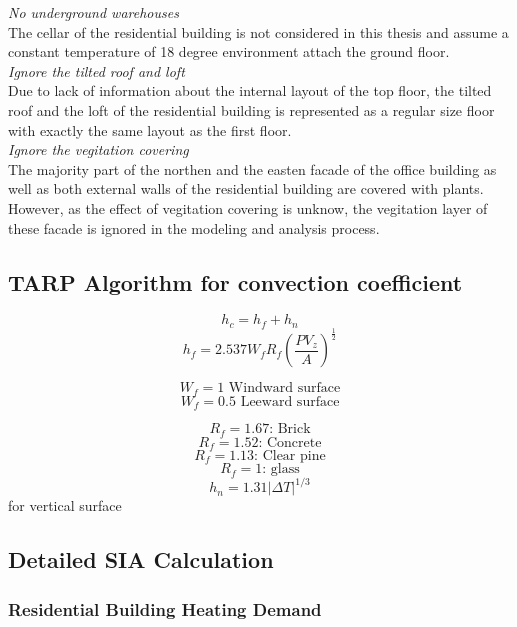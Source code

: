 \documentclass[11pt, a4paper]{article}
\theoremstyle{definition}
\begin{document}
	\textit{No underground warehouses}\\
	The cellar of the residential building is not considered in this thesis and assume a constant temperature of 18 degree environment attach the ground floor.\\

	\textit{Ignore the tilted roof and loft}\\
	Due to lack of information about the internal layout of the top floor, the tilted roof and the loft of the residential building is represented as a regular size floor with exactly the same layout as the first floor.\\

	\textit{Ignore the vegitation covering}\\
	The majority part of the northen and the easten facade of the office building as well as both external walls of the residential building are covered with plants. However, as the effect of vegitation covering is unknow, the vegitation layer of these facade is ignored in the modeling and analysis process.\\


\subsection{TARP Algorithm for convection coefficient}
\[h_c = h_f + h_n\]
\[h_f = 2.537 W_f R_f \left(\frac{PV_z}{A}\right)^\frac{1}{2}\]


\[W_f = 1  \text{   Windward surface}\]
\[W_f = 0.5 \text{   Leeward surface}\]

\[R_f = 1.67 \text{: Brick}\]
\[R_f = 1.52 \text{: Concrete}\]
\[R_f = 1.13 \text{: Clear pine}\]
\[R_f = 1 \text{: glass}\]
\[h_n = 1.31 | \Delta T|^{1/3}\]
for vertical surface


\subsection{Detailed SIA Calculation}
	
		
	\subsubsection{Residential Building Heating Demand}
		
\end{document}
